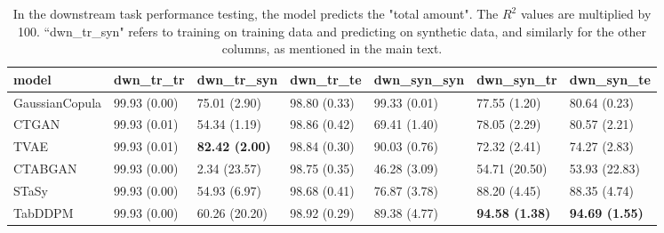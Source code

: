 \begin{table*}[h!t]
\vspace{-5mm}
\caption{In the downstream task performance testing, the model predicts the "total amount". The $R^2$ values are multiplied by 100. ``dwn\_tr\_syn" refers to training on training data and predicting on synthetic data, and similarly for the other columns, as mentioned in the main text.}
\label{tab:downstream}
\begin{adjustbox}{width=\textwidth, center} 

\begin{tabular}{|l|l|l|l|l|l|l|}
\hline
model          & dwn\_tr\_tr  & dwn\_tr\_syn          & dwn\_tr\_te  & dwn\_syn\_syn & dwn\_syn\_tr          & dwn\_syn\_te          \\ \hline
GaussianCopula & 99.93 (0.00) & 75.01 (2.90)          & 98.80 (0.33) & 99.33 (0.01)  & 77.55 (1.20)          & 80.64 (0.23)          \\ \hline
CTGAN          & 99.93 (0.01) & 54.34 (1.19)          & 98.86 (0.42) & 69.41 (1.40)  & 78.05 (2.29)          & 80.57 (2.21)          \\ \hline
TVAE           & 99.93 (0.01) & \textbf{82.42 (2.00)} & 98.84 (0.30) & 90.03 (0.76)  & 72.32 (2.41)          & 74.27 (2.83)          \\ \hline
CTABGAN        & 99.93 (0.00) & 2.34 (23.57)          & 98.75 (0.35) & 46.28 (3.09)  & 54.71 (20.50)         & 53.93 (22.83)         \\ \hline
STaSy          & 99.93 (0.00) & 54.93 (6.97)          & 98.68 (0.41) & 76.87 (3.78)  & 88.20 (4.45)          & 88.35 (4.74)          \\ \hline
TabDDPM        & 99.93 (0.00) & 60.26 (20.20)         & 98.92 (0.29) & 89.38 (4.77)  & \textbf{94.58 (1.38)} & \textbf{94.69 (1.55)} \\ \hline
\end{tabular}

\end{adjustbox}
\vspace{-5mm}
\end{table*}